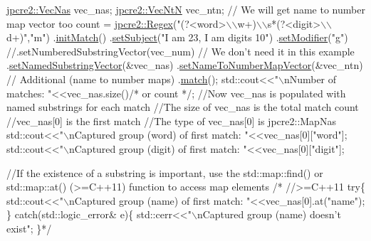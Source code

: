 \begin{DoxyCode}
\hyperlink{namespacejpcre2_a2b121ae776ea5b2913839f418a7d856b}{jpcre2::VecNas} vec\_nas;
\hyperlink{namespacejpcre2_a88a7aaf84cad627d34c8152e726168eb}{jpcre2::VecNtN} vec\_ntn; \textcolor{comment}{// We will get name to number map vector too}
count = 
\hyperlink{classjpcre2_1_1Regex}{jpcre2::Regex}(\textcolor{stringliteral}{"(?<word>\(\backslash\)\(\backslash\)w+)\(\backslash\)\(\backslash\)s*(?<digit>\(\backslash\)\(\backslash\)d+)"},\textcolor{stringliteral}{"m"})
        .\hyperlink{classjpcre2_1_1Regex_a519b0915bf1163c6ce6a4d674b30cfcd_a519b0915bf1163c6ce6a4d674b30cfcd}{initMatch}()
        .\hyperlink{classjpcre2_1_1RegexMatch_a635c652195deaa8ebb9e107c4f972aab_a635c652195deaa8ebb9e107c4f972aab}{setSubject}(\textcolor{stringliteral}{"I am 23, I am digits 10"})
        .\hyperlink{classjpcre2_1_1RegexMatch_a9df7e92f96b61553f62720cb8f5f23e5_a9df7e92f96b61553f62720cb8f5f23e5}{setModifier}(\textcolor{stringliteral}{"g"})
        \textcolor{comment}{//.setNumberedSubstringVector(vec\_num) // We don't need it in this example}
        .\hyperlink{classjpcre2_1_1RegexMatch_ae495431f57cae54363331237ab21b56c_ae495431f57cae54363331237ab21b56c}{setNamedSubstringVector}(&vec\_nas)
        .\hyperlink{classjpcre2_1_1RegexMatch_a04926e61d8b5f1d8bdf344efecd567d8_a04926e61d8b5f1d8bdf344efecd567d8}{setNameToNumberMapVector}(&vec\_ntn) \textcolor{comment}{// Additional (name to number maps)}
        .\hyperlink{classjpcre2_1_1RegexMatch_a5868aef3a146594ea1ebef34d122bb33_a5868aef3a146594ea1ebef34d122bb33}{match}();
std::cout<<\textcolor{stringliteral}{"\(\backslash\)nNumber of matches: "}<<vec\_nas.size()\textcolor{comment}{/* or count */};
\textcolor{comment}{//Now vec\_nas is populated with named substrings for each match}
\textcolor{comment}{//The size of vec\_nas is the total match count}
\textcolor{comment}{//vec\_nas[0] is the first match}
\textcolor{comment}{//The type of vec\_nas[0] is jpcre2::MapNas}
std::cout<<\textcolor{stringliteral}{"\(\backslash\)nCaptured group (word) of first match: "}<<vec\_nas[0][\textcolor{stringliteral}{"word"}];
std::cout<<\textcolor{stringliteral}{"\(\backslash\)nCaptured group (digit) of first match: "}<<vec\_nas[0][\textcolor{stringliteral}{"digit"}];

\textcolor{comment}{//If the existence of a substring is important, use the std::map::find() or std::map::at() (>=C++11)
       function to access map elements}
\textcolor{comment}{/* //>=C++11}
\textcolor{comment}{try\{}
\textcolor{comment}{    std::cout<<"\(\backslash\)nCaptured group (name) of first match: "<<vec\_nas[0].at("name");}
\textcolor{comment}{\} catch(std::logic\_error& e)\{}
\textcolor{comment}{    std::cerr<<"\(\backslash\)nCaptured group (name) doesn't exist";}
\textcolor{comment}{\}*/}


\end{DoxyCode}
